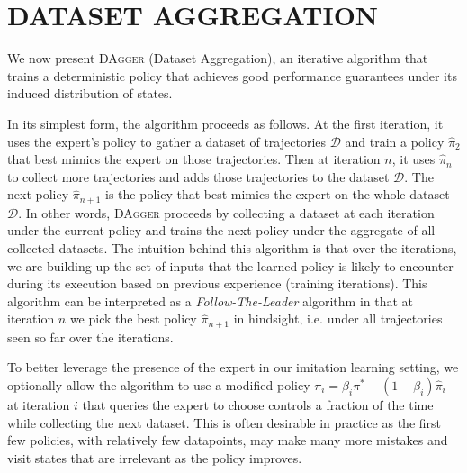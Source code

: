 \documentclass[twoside]{article}
\begin{document}
\section{DATASET AGGREGATION} \label{secDAgger}
%
We now present \textsc{DAgger} (Dataset Aggregation), an iterative algorithm that trains a deterministic policy that achieves good performance guarantees under its induced distribution of states.

In its simplest form, the algorithm proceeds as follows. At the first iteration, it uses the expert's policy to gather a dataset of trajectories $\mathcal{D}$ and train a policy $\hat{\pi}_2$ that best mimics the expert on those trajectories. Then at iteration $n$, it uses $\hat{\pi}_{n}$ to collect more trajectories and adds those trajectories to the dataset $\mathcal{D}$. The next policy $\hat{\pi}_{n+1}$ is the policy that best mimics the expert on the whole dataset $\mathcal{D}$. In other words, \textsc{DAgger} proceeds by collecting a dataset at each iteration under the current policy and trains the next policy under the aggregate of all collected datasets. The intuition behind this algorithm is that over the iterations, we are building up the set of inputs that the learned policy is likely to encounter during its execution based on previous experience (training iterations). This algorithm can be interpreted as a \emph{Follow-The-Leader} algorithm in that at iteration $n$ we pick the best policy $\hat{\pi}_{n+1}$ in hindsight, i.e. under all trajectories seen so far over the iterations.

To better leverage the presence of the expert in our imitation learning setting, we optionally allow the algorithm to use a modified policy  $\pi_i = \beta_i \pi^* + (1-\beta_i) \hat{\pi}_i$ at iteration $i$ that queries the expert to choose controls a fraction of the time while collecting the next dataset.
This is often desirable in practice as the first few policies, with relatively few datapoints, may make many more mistakes and visit states that are irrelevant as the policy improves.
\end{document}
